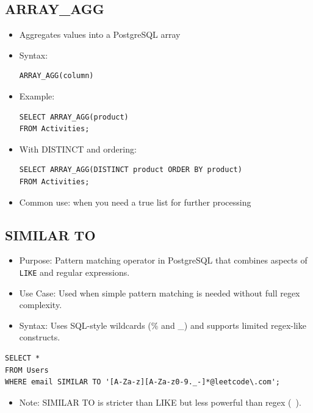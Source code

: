 \documentclass[10pt]{article}
\begin{document}
\subsection{ARRAY\_AGG}
\begin{itemize}
    \item Aggregates values into a PostgreSQL array
    \item Syntax:
\begin{verbatim}
ARRAY_AGG(column)
\end{verbatim}
    \item Example:
\begin{verbatim}
SELECT ARRAY_AGG(product)
FROM Activities;
\end{verbatim}
    \item With DISTINCT and ordering:
\begin{verbatim}
SELECT ARRAY_AGG(DISTINCT product ORDER BY product)
FROM Activities;
\end{verbatim}
    \item Common use: when you need a true list for further processing
\end{itemize}

\subsection{SIMILAR TO}
\begin{itemize}
    \item Purpose: Pattern matching operator in PostgreSQL that combines aspects of \texttt{LIKE} and regular expressions.
    \item Use Case: Used when simple pattern matching is needed without full regex complexity.
    \item Syntax: Uses SQL-style wildcards (\% and \_) and supports limited regex-like constructs.
\end{itemize}

\begin{verbatim}
SELECT *
FROM Users
WHERE email SIMILAR TO '[A-Za-z][A-Za-z0-9._-]*@leetcode\.com';
\end{verbatim}

\begin{itemize}
    \item Note: SIMILAR TO is stricter than LIKE but less powerful than regex (~).
\end{itemize}

\end{document}
